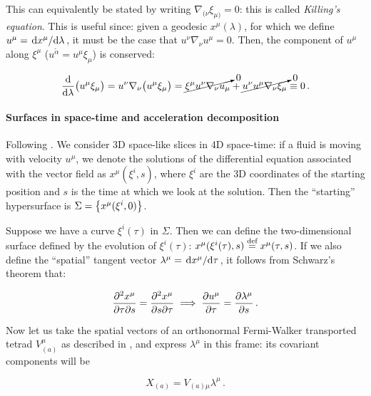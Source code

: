 \documentclass[main.tex]{subfiles}
\begin{document}
This can equivalently be stated by writing \(\nabla_{(\nu} \xi_{\mu)}=0\): this is called \emph{Killing's equation}. This is useful since: given a geodesic \(x^\mu(\lambda)\), for which we define \(u^\mu = \dv*{x^\mu}{\lambda} \), it must be the case that \(u^\nu \nabla_\nu u^\mu = 0 \). Then, the component of \(u^\mu\) along \(\xi^\mu\) (\(u^{\widetilde{\alpha}} = u^\mu \xi_\mu\)) is conserved:

\begin{equation}
    \dv{}{\lambda} \qty(u^\mu \xi_\mu) = u^\nu \nabla_\nu \qty(u^\mu \xi_\mu)
    = \cancelto{0}{\xi^\mu u^\nu \nabla_\nu u_\mu} + \cancelto{0}{u^\nu u^\mu \nabla_\nu \xi_\mu} \equiv 0 \,.
\end{equation}

\paragraph{Surfaces in space-time and acceleration decomposition}

Following \cite[section 4]{Taub:1978}.
We consider 3D space-like slices in 4D space-time: if a fluid is moving with velocity \(u^\mu\), we denote the solutions of the differential equation associated with the vector field as \(x^\mu (\xi^i, s)\), where \(\xi^i\) are the 3D coordinates of the starting position and \(s\) is the time at which we look at the solution. Then the ``starting'' hypersurface is \(\Sigma = \qty{x^\mu (\xi^i, 0)}\).

Suppose we have a curve \(\xi^i(\tau)\) in \(\Sigma\). Then we can define the two-dimensional surface defined by the evolution of \(\xi^i(\tau)\): \(x^{\mu} (\xi^i(\tau), s) \stackrel{\text{def}}{=} x^\mu (\tau, s)\).
If we also define the ``spatial'' tangent vector \(\lambda^\mu = \dv*{x^\mu}{\tau} \), it follows from Schwarz's theorem that:

\begin{equation} \label{eq:schwarz-spacetime-tube}
    \pdv{x^\mu}{\tau}{s} =
    \pdv{x^\mu}{s}{\tau}
    \implies
    \pdv{u^\mu}{\tau} = \pdv{\lambda^\mu}{s} \,.
\end{equation}

Now let us take the spatial vectors of an orthonormal Fermi-Walker transported tetrad \(V^\mu_{(a)}\) as described in , and express \(\lambda^\mu\) in this frame: its covariant components will be

\begin{equation} \label{eq:tetrad-components-lambda}
    X_{(a)} = V_{(a)\mu} \lambda^\mu \,.
\end{equation}
\end{document}

